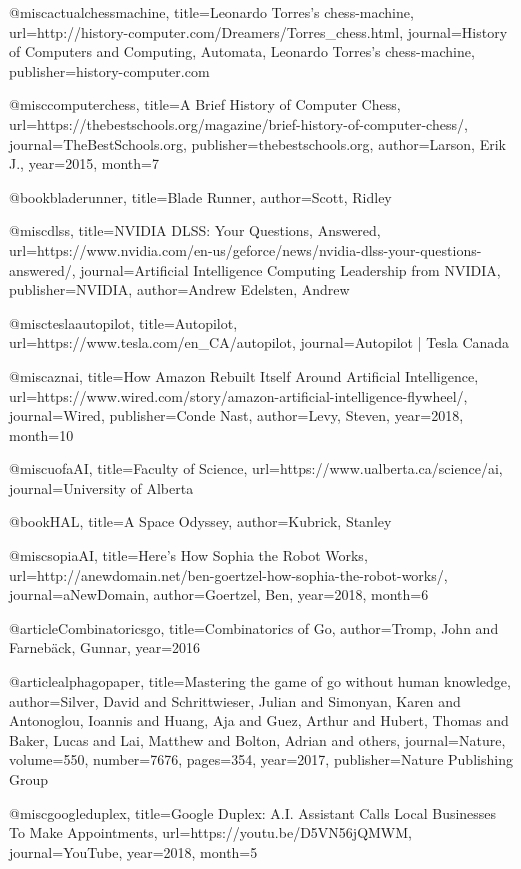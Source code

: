 @misc{actualchessmachine, title={Leonardo Torres's chess-machine}, url={http://history-computer.com/Dreamers/Torres_chess.html}, journal={History of Computers and Computing, Automata, Leonardo Torres's chess-machine}, publisher={history-computer.com}} 


@misc{computerchess, title={A Brief History of Computer Chess}, url={https://thebestschools.org/magazine/brief-history-of-computer-chess/}, journal={TheBestSchools.org}, publisher={thebestschools.org}, author={Larson, Erik J.}, year={2015}, month=7} 

@book{bladerunner, title={Blade Runner}, author={Scott, Ridley}} 

@misc{dlss, title={NVIDIA DLSS: Your Questions, Answered}, url={https://www.nvidia.com/en-us/geforce/news/nvidia-dlss-your-questions-answered/}, journal={Artificial Intelligence Computing Leadership from NVIDIA}, publisher={NVIDIA}, author={Andrew Edelsten, Andrew}} 

@misc{teslaautopilot, title={Autopilot}, url={https://www.tesla.com/en_CA/autopilot}, journal={Autopilot | Tesla Canada}}

@misc{aznai, title={How Amazon Rebuilt Itself Around Artificial Intelligence}, url={https://www.wired.com/story/amazon-artificial-intelligence-flywheel/}, journal={Wired}, publisher={Conde Nast}, author={Levy, Steven}, year={2018}, month=10} 

@misc{uofaAI, title={Faculty of Science}, url={https://www.ualberta.ca/science/ai}, journal={University of Alberta}} 

@book{HAL, title={A Space Odyssey}, author={Kubrick, Stanley} }

@misc{sopiaAI, title={Here's How Sophia the Robot Works}, url={http://anewdomain.net/ben-goertzel-how-sophia-the-robot-works/}, journal={aNewDomain}, author={Goertzel, Ben}, year={2018}, month=6} 

@article{Combinatoricsgo,
  title={Combinatorics of Go},
  author={Tromp, John and Farneb{\"a}ck, Gunnar},
  year={2016}
}

@article{alphagopaper,
  title={Mastering the game of go without human knowledge},
  author={Silver, David and Schrittwieser, Julian and Simonyan, Karen and Antonoglou, Ioannis and Huang, Aja and Guez, Arthur and Hubert, Thomas and Baker, Lucas and Lai, Matthew and Bolton, Adrian and others},
  journal={Nature},
  volume={550},
  number={7676},
  pages={354},
  year={2017},
  publisher={Nature Publishing Group}
}

@misc{googleduplex, title={Google Duplex: A.I. Assistant Calls Local Businesses To Make Appointments}, url={https://youtu.be/D5VN56jQMWM}, journal={YouTube}, year={2018}, month=5} 

